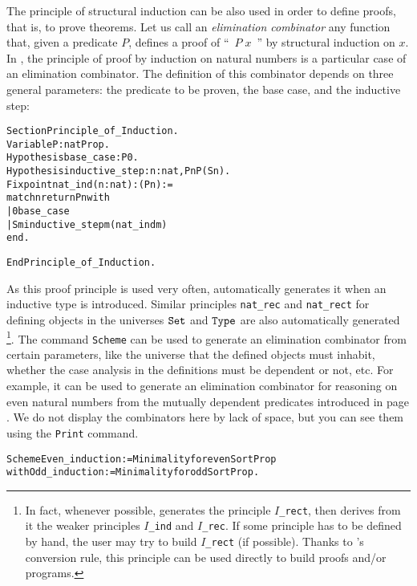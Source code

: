 \documentclass[11pt]{article}
\newcommand{\refmancite}[1]{{}}
\begin{document}
The principle of structural induction can be also used in order to
define proofs, that is, to prove theorems. Let us call an
\textsl{elimination combinator} any function that, given a predicate
$P$, defines a proof of ``~$P\;x$~'' by structural induction on $x$.  In
{\coq}, the principle of proof by induction on natural numbers is a
particular case of an elimination combinator. The definition of this
combinator depends on three general parameters: the predicate to be
proven, the base case, and the inductive step:

\begin{alltt}
Section Principle_of_Induction.
Variable    P               : nat {\arrow} Prop.
Hypothesis  base_case       : P 0.
Hypothesis  inductive_step  : {\prodsym} n:nat, P n {\arrow} P (S n).
Fixpoint nat_ind  (n:nat)   : (P n) :=
   match n return P n with
          | 0 {\funarrow} base_case
          | S m {\funarrow} inductive_step m (nat_ind m)
   end.

End Principle_of_Induction.
\end{alltt}

As this proof principle is used very often, {\coq} automatically generates it
when an inductive type is introduced.  Similar principles
\texttt{nat\_rec} and \texttt{nat\_rect} for defining objects in the
universes $\texttt{Set}$ and $\texttt{Type}$ are also automatically generated
\footnote{In fact, whenever possible, {\coq} generates the
principle \texttt{$I$\_rect}, then derives from it the
weaker principles  \texttt{$I$\_ind} and \texttt{$I$\_rec}.
If some principle has to be defined by hand, the user may try
to build \texttt{$I$\_rect} (if possible). Thanks to {\coq}'s conversion
rule, this principle can be used directly to build proofs and/or
programs.}. The
command \texttt{Scheme} \refmancite{Section \ref{Scheme}} can be
used to generate an elimination combinator from certain parameters,
like the universe that the defined objects must inhabit, whether the
case analysis in the definitions must be dependent or not, etc. For
example, it can be used to generate an elimination combinator for
reasoning on even natural numbers from the mutually dependent
predicates introduced in page \pageref{Even}. We do not display the
combinators here by lack of space, but you can see them using the
\texttt{Print} command.

\begin{alltt}
Scheme Even_induction := Minimality for even Sort Prop
with   Odd_induction  := Minimality for odd  Sort Prop.
\end{alltt}
\end{document}
